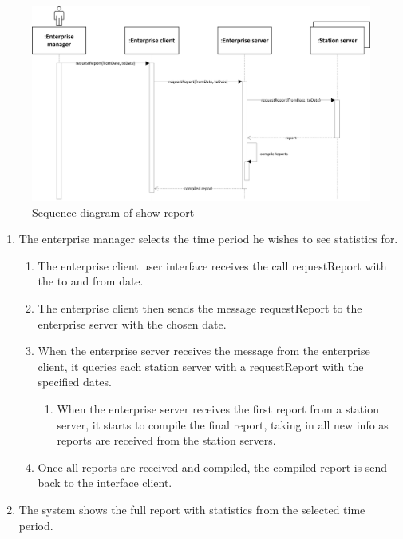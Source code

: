 \documentclass[11pt]{article}
\begin{document}
\begin{figure}[h]
\centering
\includegraphics[width=0.7\linewidth]{../report/img/sequence_diagrams/sequence_diagram_show_reports.png}
\caption[fig1]{Sequence diagram of show report}
\label{fig1}
\end{figure}

\begin{enumerate}
\item The enterprise manager selects the time period he wishes to see statistics for.

\begin{enumerate}
\item The enterprise client user interface receives the call requestReport with the to and from date.
\item The enterprise client then sends the message requestReport to the enterprise server with the chosen date.
\item When the enterprise server receives the message from the enterprise client, it queries each station server with a requestReport with the specified dates.
\begin{enumerate}
\item When the enterprise server receives the first report from a station server, it starts to compile the final report, taking in all new info as reports are received from the station servers.
\end{enumerate}
\item Once all reports are received and compiled, the compiled report is send back to the interface client.
\end{enumerate}
\item The system shows the full report with statistics from the selected time period.
\end{enumerate}
\end{document}
